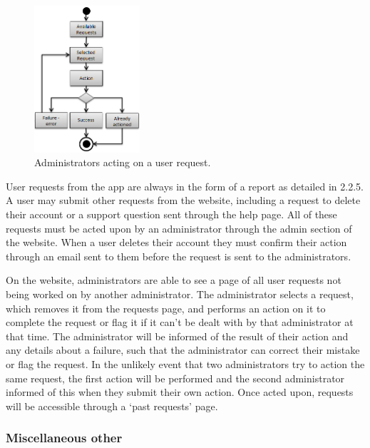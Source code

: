 \begin{figure}
	\vspace{-20pt}
	\begin{center}
	\includegraphics[width=0.35\textwidth]{images/admins_acting}
	\caption{Administrators acting on a user request.}
	\label{admins_acting}
	\end{center}
	\vspace{-20pt}
\end{figure}

User requests from the app are always in the form of a report as detailed in 2.2.5. A user may submit other requests from the website, including a request to delete their account or a support question sent through the help page. All of these requests must be acted upon by an administrator through the admin section of the website. When a user deletes their account they must confirm their action through an email sent to them before the request is sent to the administrators.

On the website, administrators are able to see a page of all user requests not being worked on by another administrator. The administrator selects a request, which removes it from the requests page, and performs an action on it to complete the request or flag it if it can’t be dealt with by that administrator at that time. The administrator will be informed of the result of their action and any details about a failure, such that the administrator can correct their mistake or flag the request. In the unlikely event that two administrators try to action the same request, the first action will be performed and the second administrator informed of this when they submit their own action. Once acted upon, requests will be accessible through a ‘past requests’ page.

\subsubsection{Miscellaneous other}

